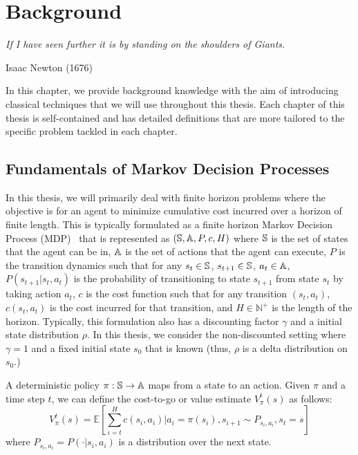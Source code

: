 \chapter{Background}
\label{cha:background}

\epigraph{\textit{If I have seen further it is by standing on the
    shoulders of Giants.}}{Isaac Newton (1676)}

In this chapter, we provide background knowledge with the aim of
introducing classical techniques
that we will use throughout this thesis. Each chapter of this thesis
is self-contained and has detailed definitions that are more tailored
to the specific problem tackled in each chapter.

\section{Fundamentals of Markov Decision Processes}
\label{sec:fund-mark-decis}

In this thesis, we will primarily deal with finite horizon problems
where the objective is for an agent to minimize cumulative cost incurred over a
horizon of finite length. This is typically formulated as a finite horizon Markov
Decision Process (MDP)~\cite{bellman} that is represented as
$(\mathbb{S}, \mathbb{A}, P, c, H)$ where $\mathbb{S}$ is the set
of states that the agent can be in, $\mathbb{A}$ is the set of
actions that the agent can execute, $P$ is the transition dynamics
such that for any $s_t \in \mathbb{S}$, $s_{t+1} \in \mathbb{S}$,
$a_t \in \mathbb{A}$, $P(s_{t+1}|s_t, a_t)$ is the probability of
transitioning to state $s_{t+1}$ from state $s_t$ by taking action
$a_t$, $c$ is the cost function such that for any transition $(s_t,
a_t)$, $c(s_t, a_t)$ is the cost incurred for that transition, and $H
\in \mathbb{N}^+$ is the length of the horizon. Typically, this
formulation also has a discounting factor $\gamma$ and a initial state
distribution $\rho$. In this thesis, we consider the non-discounted
setting where $\gamma = 1$ and a fixed initial state $s_0$ that is
known (thus, $\rho$ is a delta distribution on $s_0$.)

A deterministic policy $\pi: \mathbb{S} \rightarrow \mathbb{A}$
maps from a state to an action. Given $\pi$ and a time step $t$, we can define the 
cost-to-go or value estimate $V_\pi^t(s)$ as follows:
\begin{equation}
  \label{eq:3}
  V_\pi^t(s) = \mathbb{E}\left[ \sum_{i=t}^H c(s_i, a_i) | a_i =
    \pi(s_i), s_{i+1} \sim P_{s_i, a_i}, s_t = s \right]
\end{equation}
where $P_{s_i, a_i} = P(\cdot|s_i, a_i)$ is a distribution over the
next state.

